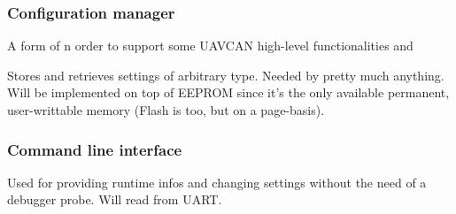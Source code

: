 \subsubsection{Configuration manager}
A form of n order to support some UAVCAN high-level functionalities and 

Stores and retrieves settings of arbitrary type.
Needed by pretty much anything.
Will be implemented on top of EEPROM since it's the only available permanent, user-writtable memory (Flash is too, but on a page-basis).

\subsubsection{Command line interface}
Used for providing runtime infos and changing settings without the need of a debugger probe.
Will read from UART.
